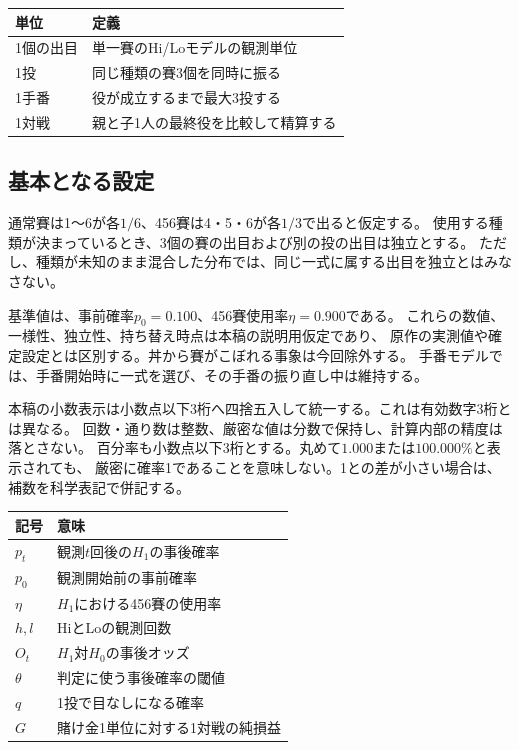 \documentclass[11pt,a4paper]{article}
\numberwithin{equation}{section}
\begin{document}
\begin{center}
\begin{tabular}{ll}
\toprule
単位 & 定義\\
\midrule
1個の出目 & 単一賽のHi/Loモデルの観測単位\\
1投 & 同じ種類の賽3個を同時に振る\\
1手番 & 役が成立するまで最大3投する\\
1対戦 & 親と子1人の最終役を比較して精算する\\
\bottomrule
\end{tabular}
\end{center}

\subsection{基本となる設定}
通常賽は1〜6が各$1/6$、456賽は4・5・6が各$1/3$で出ると仮定する。
使用する種類が決まっているとき、3個の賽の出目および別の投の出目は独立とする。
ただし、種類が未知のまま混合した分布では、同じ一式に属する出目を独立とはみなさない。

基準値は、事前確率$p_0=0.100$、456賽使用率$\eta=0.900$である。
これらの数値、一様性、独立性、持ち替え時点は本稿の説明用仮定であり、
原作の実測値や確定設定とは区別する。丼から賽がこぼれる事象は今回除外する。
手番モデルでは、手番開始時に一式を選び、その手番の振り直し中は維持する。

本稿の小数表示は小数点以下3桁へ四捨五入して統一する。これは有効数字3桁とは異なる。
回数・通り数は整数、厳密な値は分数で保持し、計算内部の精度は落とさない。
百分率も小数点以下3桁とする。丸めて$1.000$または$100.000\%$と表示されても、
厳密に確率1であることを意味しない。1との差が小さい場合は、補数を科学表記で併記する。

\begin{center}
\begin{tabular}{ll}
\toprule
記号 & 意味\\
\midrule
$p_t$ & 観測$t$回後の$H_1$の事後確率\\
$p_0$ & 観測開始前の事前確率\\
$\eta$ & $H_1$における456賽の使用率\\
$h,l$ & HiとLoの観測回数\\
$O_t$ & $H_1$対$H_0$の事後オッズ\\
$\theta$ & 判定に使う事後確率の閾値\\
$q$ & 1投で目なしになる確率\\
$G$ & 賭け金1単位に対する1対戦の純損益\\
\bottomrule
\end{tabular}
\end{center}
\end{document}
